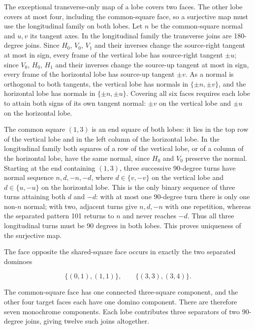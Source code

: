 \documentclass[
  11pt,
]{article}
\begin{document}
The exceptional transverse-only map of a lobe covers two faces. The
other lobe covers at most four, including the common-square face, so a
surjective map must use the longitudinal family on both lobes. Let \(n\)
be the common-square normal and \(u,v\) its tangent axes. In the
longitudinal family the transverse joins are 180-degree joins. Since
\(H_0\), \(V_0\), \(V_1\) and their inverses change the source-right
tangent at most in sign, every frame of the vertical lobe has
source-right tangent \(\pm u\); since \(V_0\), \(H_0\), \(H_1\) and
their inverses change the source-up tangent at most in sign, every frame
of the horizontal lobe has source-up tangent \(\pm v\). As a normal is
orthogonal to both tangents, the vertical lobe has normals in
\(\{\pm n,\pm v\}\), and the horizontal lobe has normals in
\(\{\pm n,\pm u\}\). Covering all six faces requires each lobe to attain
both signs of its own tangent normal: \(\pm v\) on the vertical lobe and
\(\pm u\) on the horizontal lobe.

The common square \((1,3)\) is an end square of both lobes: it lies in
the top row of the vertical lobe and in the left column of the
horizontal lobe. In the longitudinal family both squares of a row of the
vertical lobe, or of a column of the horizontal lobe, have the same
normal, since \(H_0\) and \(V_0\) preserve the normal. Starting at the
end containing \((1,3)\), three successive 90-degree turns have normal
sequence \(n,d,-n,-d\), where \(d\in\{v,-v\}\) on the vertical lobe and
\(d\in\{u,-u\}\) on the horizontal lobe. This is the only binary
sequence of three turns attaining both \(d\) and \(-d\): with at most
one 90-degree turn there is only one non-\(n\) normal; with two,
adjacent turns give \(n,d,-n\) with one repetition, whereas the
separated pattern 101 returns to \(n\) and never reaches \(-d\). Thus
all three longitudinal turns must be 90 degrees in both lobes. This
proves uniqueness of the surjective map.

The face opposite the shared-square face occurs in exactly the two
separated dominoes

\[
\{(0,1),(1,1)\},\qquad\{(3,3),(3,4)\}.
\]

The common-square face has one connected three-square component, and the
other four target faces each have one domino component. There are
therefore seven monochrome components. Each lobe contributes three
separators of two 90-degree joins, giving twelve such joins altogether.
\end{document}
